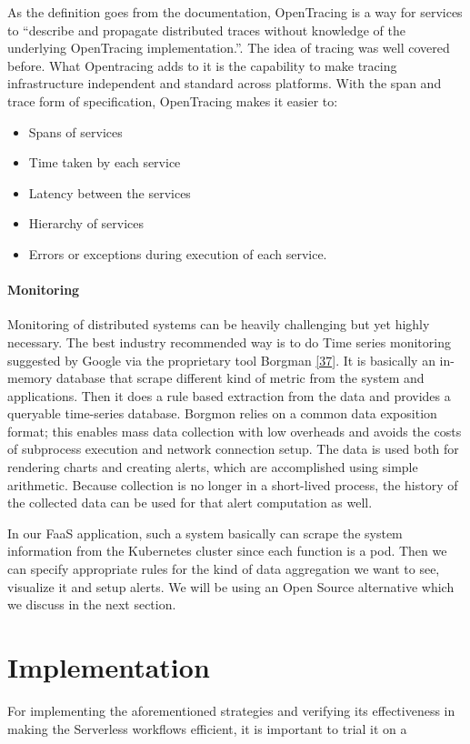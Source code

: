 \documentclass[12pt,titlepage]{article}
\begin{document}
As the definition goes from the documentation, OpenTracing is a way for services
to “describe and propagate distributed traces without knowledge of the
underlying OpenTracing implementation.”. The idea of tracing was well covered
before. What Opentracing adds to it is the capability to make tracing
infrastructure independent and standard across platforms. With the span and
trace form of specification, OpenTracing makes it easier to:
\begin{itemize}
\item Spans of services
\item Time taken by each service
\item Latency between the services
\item Hierarchy of services
\item Errors or exceptions during execution of each service.
\end{itemize}
\paragraph{Monitoring}
\label{sec:org3dd3fb3}
Monitoring of distributed systems can be heavily challenging but yet highly
necessary. The best industry recommended way is to do Time series monitoring
suggested by Google via the proprietary tool Borgman \hyperref[ref:37]{[37}]. It
is basically an in-memory database that scrape different kind of metric from
the system and applications. Then it does a rule based extraction from the data
and provides a queryable time-series database. Borgmon relies on a common data
exposition format; this enables mass data collection with low overheads and
avoids the costs of subprocess execution and network connection setup. The data
is used both for rendering charts and creating alerts, which are accomplished
using simple arithmetic. Because collection is no longer in a short-lived
process, the history of the collected data can be used for that alert
computation as well.

In our FaaS application, such a system basically can scrape the system
information from the Kubernetes cluster since each function is a pod. Then we
can specify appropriate rules for the kind of data aggregation we want to see,
visualize it and setup alerts. We will be using an Open Source alternative
which we discuss in the next section.


\section{Implementation}
\label{sec:orgf0e7773}
For implementing the aforementioned strategies and verifying its effectiveness
in making the Serverless workflows efficient, it is important to trial it on a
\end{document}
